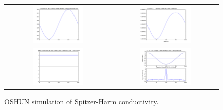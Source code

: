 \documentclass[preprint,12pt]{elsarticle}
\begin{document}

\begin{figure}[tbh]
  \begin{center}
    \begin{tabular}{cc}
      \includegraphics[width=0.5\textwidth]{../results/fe_analysis/figs/OSHUN_temperature_Z1.png} &
       \includegraphics[width=0.5\textwidth]{../results/fe_analysis/figs/OSHUN_density_Z1.png} \\
      \includegraphics[width=0.5\textwidth]{../results/fe_analysis/figs/OSHUN_heatconductivity_Z1.png} &     
      \includegraphics[width=0.5\textwidth]{../results/fe_analysis/figs/OSHUN_Efield_Z1.png} 
    \end{tabular}
  \caption{
  OSHUN simulation of Spitzer-Harm conductivity.
  }
  \end{center}
  \label{fig:C7explimpl}
\end{figure}
\end{document}
